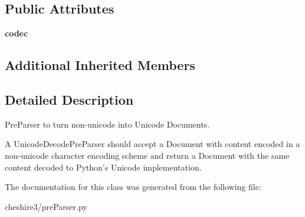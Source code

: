 \subsection*{Public Attributes}
\begin{DoxyCompactItemize}
\item 
\hypertarget{classcheshire3_1_1pre_parser_1_1_unicode_decode_pre_parser_a30f47fb8b4bcee575e5d7f6c2065310f}{{\bfseries codec}}\label{classcheshire3_1_1pre_parser_1_1_unicode_decode_pre_parser_a30f47fb8b4bcee575e5d7f6c2065310f}

\end{DoxyCompactItemize}
\subsection*{Additional Inherited Members}


\subsection{Detailed Description}
\begin{DoxyVerb}PreParser to turn non-unicode into Unicode Documents.

A UnicodeDecodePreParser should accept a Document with content encoded in 
a non-unicode character encoding scheme and return a Document with the 
same content decoded to Python's Unicode implementation.
\end{DoxyVerb}
 

The documentation for this class was generated from the following file\-:\begin{DoxyCompactItemize}
\item 
cheshire3/pre\-Parser.\-py\end{DoxyCompactItemize}
